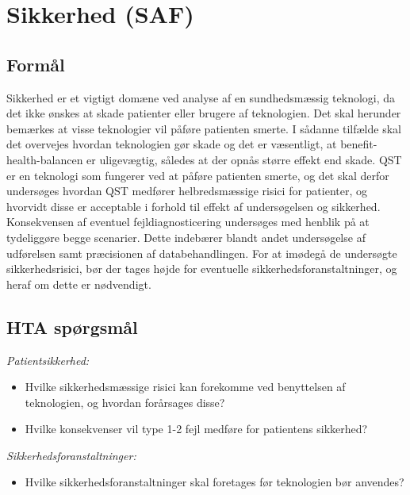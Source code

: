 \section{Sikkerhed (SAF)}
\subsection{Formål}  %
Sikkerhed er et vigtigt domæne ved analyse af en sundhedsmæssig teknologi, da det ikke ønskes at skade patienter eller brugere af teknologien. Det skal herunder bemærkes at visse teknologier vil påføre patienten smerte. I sådanne tilfælde skal det overvejes hvordan teknologien gør skade og det er væsentligt, at benefit-health-balancen er uligevægtig, således at der opnås større effekt end skade. QST er en teknologi som fungerer ved at påføre patienten smerte, og det skal derfor undersøges hvordan QST medfører helbredsmæssige risici for patienter, og hvorvidt disse er acceptable i forhold til effekt af undersøgelsen og sikkerhed. 
Konsekvensen af eventuel fejldiagnosticering undersøges med henblik på at tydeliggøre begge scenarier. Dette indebærer blandt andet undersøgelse af udførelsen samt præcisionen af databehandlingen. For at imødegå de undersøgte sikkerhedsrisici, bør der tages højde for eventuelle sikkerhedsforanstaltninger, og heraf om dette er nødvendigt. 
\subsection{HTA spørgsmål} %

\textit{Patientsikkerhed:}
\begin{itemize}
	\item Hvilke sikkerhedsmæssige risici kan forekomme ved benyttelsen af teknologien, og hvordan forårsages disse? %
	\item Hvilke konsekvenser vil type 1-2 fejl medføre for patientens sikkerhed? %
\end{itemize}
\textit{Sikkerhedsforanstaltninger:}
\begin{itemize}
	\item Hvilke sikkerhedsforanstaltninger skal foretages før teknologien bør anvendes?  %
\end{itemize}

